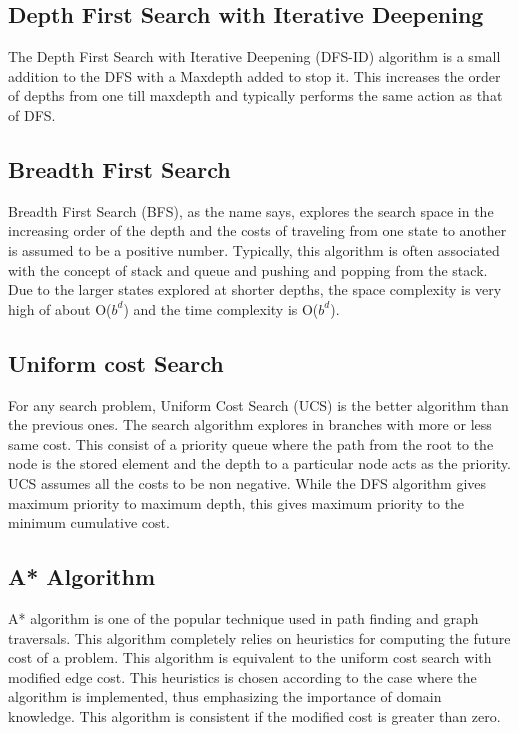 \documentclass[10pt, final]{article}
\begin{document}
\begin{multicols}{2}
	\subsection{Depth First Search with Iterative Deepening}
	The Depth First Search with Iterative Deepening (DFS-ID) algorithm is a small addition to the DFS with a Maxdepth added to stop it. This increases the order of depths from one till maxdepth and typically performs the same action as that of DFS. 
	\subsection{Breadth First Search}
	Breadth First Search (BFS), as the name says, explores the search space in the increasing order of the depth and the costs of traveling from one state to another is assumed to be a positive number. Typically, this algorithm is often associated with the concept of stack and queue and pushing and popping from the stack. Due to the larger states explored at shorter depths, the space complexity is very high of about O($b^d$) and the time complexity is O($b^d$). 
	\subsection{Uniform cost Search}
	For any search problem, Uniform Cost Search (UCS) is the better algorithm than the previous ones. The search algorithm explores in branches with more or less same cost. This consist of a priority queue where the path from the root to the node is the stored element and the depth to a particular node acts as the priority. UCS assumes all the costs to be non negative. While the DFS algorithm gives maximum priority to maximum depth, this gives maximum priority to the minimum cumulative cost. 
	\subsection{A* Algorithm}
	A* algorithm is one of the popular technique used in path finding and graph traversals. This algorithm completely relies on heuristics for computing the future cost of a problem. This algorithm is equivalent to the uniform cost search with modified edge cost. This heuristics is chosen according to the case where the algorithm is implemented, thus emphasizing the importance of domain knowledge. This algorithm is consistent if the modified cost is greater than zero.

\end{multicols}
\end{document}
